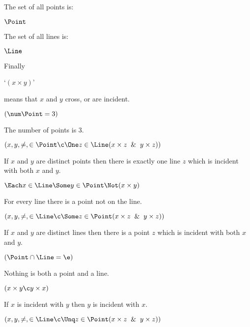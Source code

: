 


\lineb

\centerline{}
\lineb
\lineb

%



\noindent{}The set of all points is: 
\lineb

$\Point$
\lineb

\noindent{}The set of all lines is: 
\lineb

$\Line$
\lineb


\noindent{}Finally 
\lineb

`$(x \times y)$'
\lineb

\noindent{}means that $x$ and $y$ cross, or are incident.  
\lineb

\lineb


 $(\num \Point = 3)$
\lineb

The number of points is 3.
\lineb



 $(x,y,\ne,\in\Point \c \One z \in \Line(x \times z \And y \times z))$
\lineb

If $x$ and $y$ are distinct points then there is exactly one line $z$ which
is incident with both $x$ and $y$.
\lineb

 $\Each x \in \Line \Some y \in \Point \Not(x \times y)$
\lineb

For every line there is a point not on the line.
\lineb

 $(x,y,\ne,\in\Line\c \Some z \in \Point (x \times z \And y \times z))$
\lineb

If $x$ and $y$ are distinct lines then there is a point $z$
which is incident with both $x$ and $y$.
\lineb

 $(\Point \cap \Line = \e)$
\lineb

Nothing is both a point and a line.
\lineb


 $(x \times y \c y \times x)$
\lineb

If $x$ is incident with $y$ then $y$ is incident with $x$.
\lineb




 $(x,y,\ne,\in\Line\c \Unq z \in \Point (x \times z \And y \times z))$
\lineb


